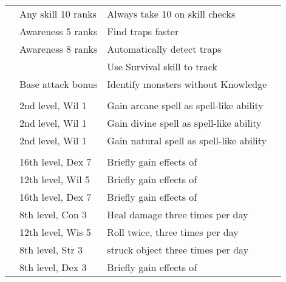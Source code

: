 {\begin{longtabu}{>{\lcol}p{10em} >{\lcol}p{15em} >{\lcol}X >{\lcol}p{3em}}
         & Any skill 10 ranks & Always take 10 on skill checks &  \\
         & Awareness 5 ranks & Find traps faster &  \\
         & Awareness 8 ranks & Automatically detect traps &  \\
         & \x &  Use Survival skill to track &  \\
         & Base attack bonus  & Identify monsters without Knowledge &  \\

        \midrule
         &  &  &  \\
         & 2nd level, Wil 1 & Gain arcane spell as spell-like ability &  \\
         & 2nd level, Wil 1 & Gain divine spell as spell-like ability &  \\
         & 2nd level, Wil 1 & Gain natural spell as spell-like ability &  \\

        \midrule
         &  &  &  \\
         & 16th level, Dex 7 & Briefly gain effects of  &  \\
         & 12th level, Wil 5 & Briefly gain effects of  &  \\
         & 16th level, Dex 7 & Briefly gain effects of  &  \\
         & 8th level, Con 3 & Heal damage three times per day &  \\
         & 12th level, Wis 5 & Roll twice, three times per day &  \\
         & 8th level, Str 3 & 
        struck object three times per day &  \\
         & 8th level, Dex 3 & Briefly gain effects of  &  \\
    \end{longtabu}
}%

